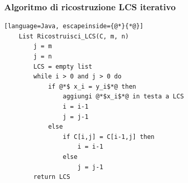 \subsubsection{Algoritmo di ricostruzione LCS iterativo}
\begin{lstlisting}[language=Java, escapeinside={@*}{*@}]
    List Ricostruisci_LCS(C, m, n)
        j = m
        j = n
        LCS = empty list
        while i > 0 and j > 0 do
            if @*$ x_i = y_i$*@ then
                aggiungi @*$x_i$*@ in testa a LCS
                i = i-1
                j = j-1
            else
                if C[i,j] = C[i-1,j] then
                    i = i-1
                else
                    j = j-1
        return LCS
\end{lstlisting}


